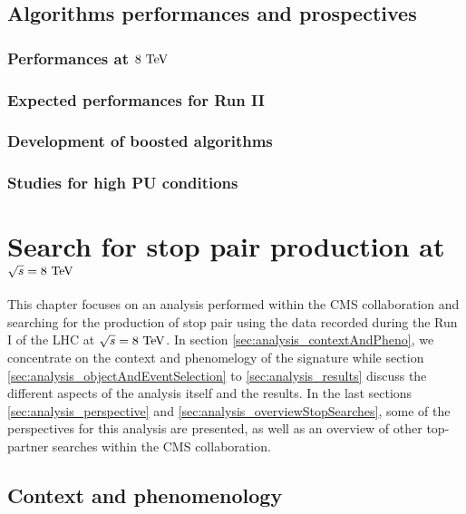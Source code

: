     \section{Algorithms performances and prospectives}
        \loremipsum
        \subsection{Performances at $8~\text{TeV}$}
        \loremipsum
        \subsection{Expected performances for Run II}
        \loremipsum
        \subsection{Development of boosted algorithms}
        \loremipsum
        \subsection{Studies for high PU conditions}
        \loremipsum







\chapter{Search for stop pair production at $\sqrt{s} = 8~\text{TeV}$}

    This chapter focuses on an analysis performed within the CMS collaboration 
    and searching for the production of stop pair using the data recorded during 
    the Run I of the LHC at $\sqrt{s} = 8~\text{TeV}$. In section \ref{sec:analysis_contextAndPheno}, 
    we concentrate on the context and phenomelogy of the signature while section 
    \ref{sec:analysis_objectAndEventSelection} to \ref{sec:analysis_results} discuss 
    the different aspects of the analysis itself and the results. In the last sections 
    \ref{sec:analysis_perspective} and \ref{sec:analysis_overviewStopSearches}, some 
    of the perspectives for this analysis are presented, as well as an overview of 
    other top-partner searches within the CMS collaboration.

    \section{Context and phenomenology \label{sec:analysis_contextAndPheno}}

